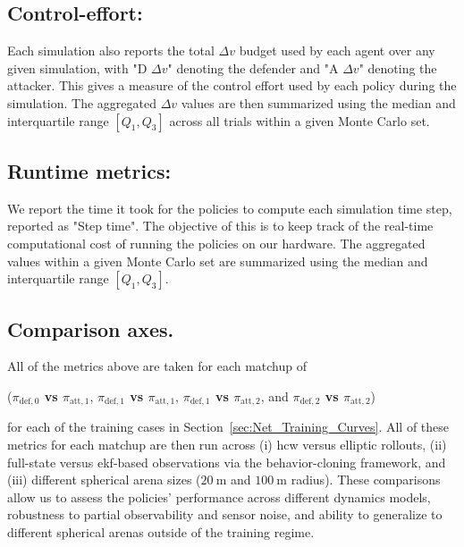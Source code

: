 
\subsection*{Control-effort:}

Each simulation also reports the total \(\Delta v\) budget used by each agent over any given simulation, with "D \(\Delta v\)" denoting the defender and "A \(\Delta v\)" denoting the attacker. This gives a measure of the control effort used by each policy during the simulation. The aggregated \(\Delta v\) values are then summarized using the median and interquartile range \([Q_1,Q_3]\)
across all trials within a given Monte Carlo set.

\subsection*{Runtime metrics:}

We report the time it took for the policies to compute each simulation time step, reported as "Step time". The objective of this is to keep track of the real-time computational cost of running the policies on our hardware. The aggregated values within a given Monte Carlo set are summarized using the median and interquartile range \([Q_1,Q_3]\).


\subsection*{Comparison axes.}
All of the metrics above are taken for each matchup of 

({\boldmath\textbf{$\pi_{\mathrm{def},0}$ vs $\pi_{\mathrm{att},1}$}}, {\boldmath\textbf{$\pi_{\mathrm{def},1}$ vs $\pi_{\mathrm{att},1}$}}, {\boldmath\textbf{$\pi_{\mathrm{def},1}$ vs $\pi_{\mathrm{att},2}$}}, and {\boldmath\textbf{$\pi_{\mathrm{def},2}$ vs $\pi_{\mathrm{att},2}$}}) 


for each of the training cases in Section~\ref{sec:Net_Training_Curves}. All of these metrics for each matchup are then run across (i) \acs{hcw} versus elliptic rollouts, (ii) full-state versus \acs{ekf}-based observations via the behavior-cloning framework, and (iii) different spherical arena sizes ($20~\mathrm{m}$ and $100~\mathrm{m}$ radius). These comparisons allow us to assess the policies' performance across different dynamics models, robustness to partial observability and sensor noise, and ability to generalize to different spherical arenas outside of the training regime.

